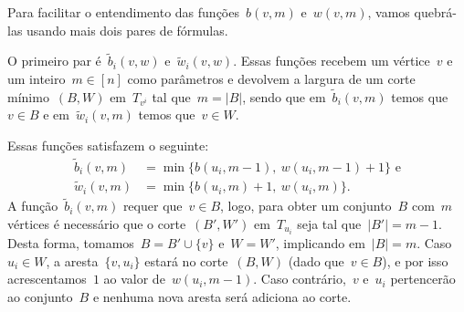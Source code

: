 \begin{itemize}
\begin{center}
 \end{center}
	Para facilitar o entendimento das funções~$b(v,m)$ 
	e~$w(v,m)$, vamos quebrá-las usando mais dois pares 
	de fórmulas.

	\medskip

	O primeiro par é~$\tilde{b}_i(v,w)$ 
	e~$\tilde{w}_i(v,w)$. 
	Essas funções recebem um 
	vértice~$v$ e um inteiro~${m\in [n]}$ como parâmetros 
	e devolvem a largura de um corte mínimo~$(B,W)$ 
	em~$T_{v^i}$ tal que~${m = |B|}$, sendo que 
	em~$\tilde{b}_i(v,m)$ temos que~${v\in B}$ e
	em~$\tilde{w}_i(v,m)$ temos que~${v\in W}$.
	
	Essas funções satisfazem o seguinte:
	\begin{align*}
		\tilde{b}_i(v,m) &= \min \{ b(u_i,m-1),\ w(u_i, m-1)+1 \} \nonumber \text{ e}\\ 
		\tilde{w}_i(v,m) &= \min \{ b(u_i,m)+1,\ w(u_i, m) \}. \nonumber
	\end{align*}
	A função~$\tilde{b}_i(v,m)$ requer que~${v\in B}$, 
	logo, para obter um conjunto~$B$ com~$m$ vértices
	é necessário que o corte~$(B',W')$ em~$T_{u_i}$ 
	seja tal que~${|B'|=m-1}$.
	Desta forma, tomamos~$B = B'\cup \{v\}$ e~$W = W'$,
	implicando em~$|B| = m$. 
	Caso~${u_i\in W}$,
	a aresta~${\{ v,u_i \}}$ estará
	no corte~$(B,W)$ (dado que~${v\in B}$), e por isso 
	acrescentamos~$1$ ao valor de~${w(u_i, m-1)}$.
	Caso contrário,~$v$ e~$u_i$ pertencerão ao
	conjunto~$B$ e nenhuma nova aresta
	será adiciona ao corte.


\end{itemize}
